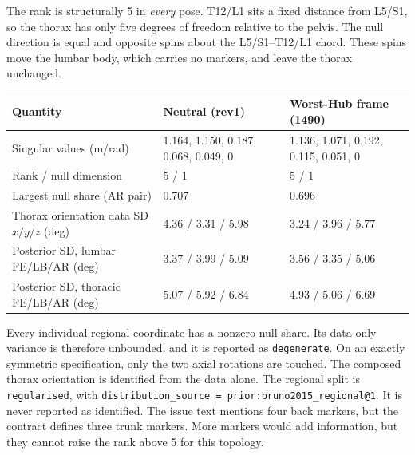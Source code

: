 \documentclass[11pt,a4paper]{article}
\begin{document}
The rank is structurally 5 in \emph{every} pose. T12/L1 sits a fixed
distance from L5/S1, so the thorax has only five degrees of freedom relative
to the pelvis. The null direction is equal and opposite spins about the
L5/S1--T12/L1 chord. These spins move the lumbar body, which carries no
markers, and leave the thorax unchanged.
\begin{center}
\begin{tabular}{lll}
Quantity & Neutral (rev1) & Worst-Hub frame (1490) \\
\hline
Singular values (m/rad) & 1.164, 1.150, 0.187, 0.068, 0.049, 0 & 1.136, 1.071, 0.192, 0.115, 0.051, 0 \\
Rank / null dimension & 5 / 1 & 5 / 1 \\
Largest null share (AR pair) & 0.707 & 0.696 \\
Thorax orientation data SD $x/y/z$ (deg) & 4.36 / 3.31 / 5.98 & 3.24 / 3.96 / 5.77 \\
Posterior SD, lumbar FE/LB/AR (deg) & 3.37 / 3.99 / 5.09 & 3.56 / 3.35 / 5.06 \\
Posterior SD, thoracic FE/LB/AR (deg) & 5.07 / 5.92 / 6.84 & 4.93 / 5.06 / 6.69 \\
\end{tabular}
\end{center}
Every individual regional coordinate has a nonzero null share. Its data-only
variance is therefore unbounded, and it is reported as \texttt{degenerate}.
On an exactly symmetric specification, only the two axial rotations are
touched. The composed thorax orientation is identified from the data alone.
The regional split is \texttt{regularised}, with
\texttt{distribution\_source = prior:bruno2015\_regional@1}. It is never
reported as identified. The issue text mentions four back markers, but the
contract defines three trunk markers. More markers would add information,
but they cannot raise the rank above 5 for this topology.
\end{document}
